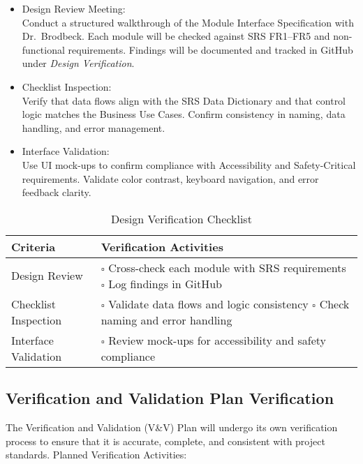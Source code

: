 \documentclass[12pt, titlepage]{article}
\begin{document}
\begin{itemize}
    \item Design Review Meeting: \\
    Conduct a structured walkthrough of the Module Interface Specification with Dr.~Brodbeck. Each module will be checked against SRS FR1--FR5 and non-functional requirements. Findings will be documented and tracked in GitHub under \textit{Design Verification}.
    
    \item Checklist Inspection: \\
    Verify that data flows align with the SRS Data Dictionary and that control logic matches the Business Use Cases. Confirm consistency in naming, data handling, and error management.
    
    \item Interface Validation: \\
    Use UI mock-ups to confirm compliance with Accessibility and Safety-Critical requirements. Validate color contrast, keyboard navigation, and error feedback clarity.
\end{itemize}

\begin{table}[H]
\centering
\caption{Design Verification Checklist}
\renewcommand{\arraystretch}{1.3}
\begin{tabular}{|p{5cm}|p{9cm}|}
\hline
Criteria & Verification Activities \\ \hline
Design Review &
\(\square\) Cross-check each module with SRS requirements \newline
\(\square\) Log findings in GitHub \\ \hline
Checklist Inspection &
\(\square\) Validate data flows and logic consistency \newline
\(\square\) Check naming and error handling \\ \hline
Interface Validation &
\(\square\) Review mock-ups for accessibility and safety compliance \\ \hline
\end{tabular}
\end{table}

\subsection{Verification and Validation Plan Verification}

The Verification and Validation (V\&V) Plan will undergo its own verification process to ensure that it is accurate, complete, and consistent with project standards. Planned Verification Activities:
\end{document}
